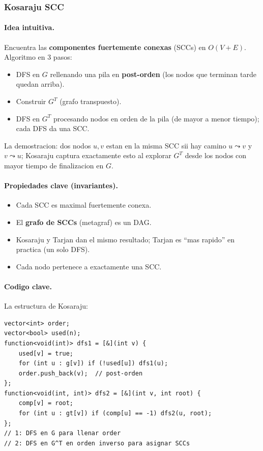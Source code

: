 ﻿\subsubsection{Kosaraju SCC}

\paragraph{Idea intuitiva.}
Encuentra las \textbf{componentes fuertemente conexas} (SCCs) en $O(V + E)$. Algoritmo en 3 pasos:
\begin{itemize}\setlength\itemsep{0pt}
	\item DFS en $G$ rellenando una pila en \textbf{post-orden} (los nodos que terminan tarde quedan arriba).
	\item Construir $G^T$ (grafo transpuesto).
	\item DFS en $G^T$ procesando nodos en orden de la pila (de mayor a menor tiempo); cada DFS da una SCC.
\end{itemize}
La demostracion: dos nodos $u, v$ estan en la misma SCC sii hay camino $u \leadsto v$ y $v \leadsto u$; Kosaraju captura exactamente esto al explorar $G^T$ desde los nodos con mayor tiempo de finalizacion en $G$.

\paragraph{Propiedades clave (invariantes).}
\begin{itemize}\setlength\itemsep{0pt}
	\item Cada SCC es maximal fuertemente conexa.
	\item El \textbf{grafo de SCCs} (metagraf) es un DAG.
	\item Kosaraju y Tarjan dan el mismo resultado; Tarjan es ``mas rapido'' en practica (un solo DFS).
	\item Cada nodo pertenece a exactamente una SCC.
\end{itemize}

\paragraph{Codigo clave.}
La estructura de Kosaraju:
\begin{verbatim}
vector<int> order;
vector<bool> used(n);
function<void(int)> dfs1 = [&](int v) {
    used[v] = true;
    for (int u : g[v]) if (!used[u]) dfs1(u);
    order.push_back(v);  // post-orden
};
function<void(int, int)> dfs2 = [&](int v, int root) {
    comp[v] = root;
    for (int u : gt[v]) if (comp[u] == -1) dfs2(u, root);
};
// 1: DFS en G para llenar order
// 2: DFS en G^T en orden inverso para asignar SCCs
\end{verbatim}

